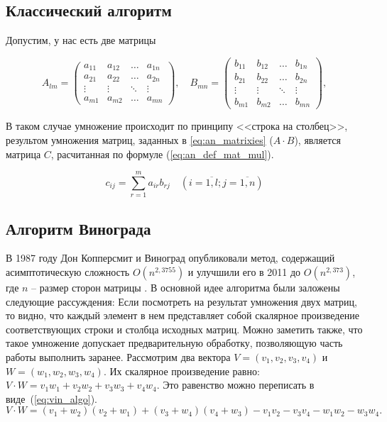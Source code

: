 \subsection{Классический алгоритм}

Допустим, у нас есть две матрицы

\begin{equation}
	\label{eq:an_matrixies}
	A_{lm} = \begin{pmatrix}
		a_{11} & a_{12} & \ldots & a_{1n}\\
		a_{21} & a_{22} & \ldots & a_{2n}\\
		\vdots & \vdots & \ddots & \vdots\\
		a_{m1} & a_{m2} & \ldots & a_{mn}
	\end{pmatrix},
	\quad
	B_{mn} = \begin{pmatrix}
		b_{11} & b_{12} & \ldots & b_{1n}\\
		b_{21} & b_{22} & \ldots & b_{2n}\\
		\vdots & \vdots & \ddots & \vdots\\
		b_{m1} & b_{m2} & \ldots & b_{mn}
	\end{pmatrix},
\end{equation}

В таком случае умножение происходит по принципу <<строка на столбец>>, результом умножения матриц, заданных в
\ref{eq:an_matrixies} ($A \cdot B$), является матрица $C$, расчитанная по формуле (\ref{eq:an_def_mat_mul}).


\begin{equation}
	\label{eq:an_def_mat_mul}
	c_{ij} =
	\sum_{r=1}^{m} a_{ir}b_{rj} \quad (i=\overline{1,l}; j=\overline{1,n})
\end{equation}


\subsection{Алгоритм Винограда}

В 1987 году Дон Копперсмит и Виноград опубликовали метод, 
содержащий асимптотическую сложность $O(n^{2,3755})$ и улучшили 
его в 2011 до $O(n^{2,373})$, где $n$ -- размер сторон матрицы \cite{book_vinograd}.
В основной идее алгоритма были заложены следующие рассуждения:
Если посмотреть на результат умножения двух матриц, 
то видно, 
что каждый элемент в нем представляет собой 
скалярное произведение соответствующих строки и 
столбца исходных матриц. 
Можно заметить также, что такое умножение допускает предварительную 
обработку, позволяющую часть работы выполнить заранее.
Рассмотрим два вектора $V = (v_1, v_2, v_3, v_4)$ и $W = (w_1, w_2, w_3, w_4)$. Их скалярное произведение равно:
$V \cdot W = v_1w_1 + v_2w_2 + v_3w_3 + v_4w_4$.
Это равенство можно переписать в виде~(\ref{eq:vin_algo}).
\begin{equation}
	\label{eq:vin_algo}
	V \cdot W = (v_1 + w_2)(v_2 + w_1) + (v_3 + w_4)(v_4 + w_3) - v_1v_2 - v_3v_4 - w_1w_2 - w_3w_4.	
\end{equation}

